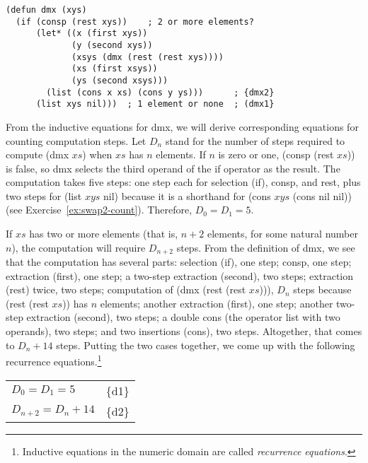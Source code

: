 \label{defun:dmx-copy}
\begin{Verbatim}
(defun dmx (xys)
  (if (consp (rest xys))    ; 2 or more elements?
      (let* ((x (first xys))
             (y (second xys))
             (xsys (dmx (rest (rest xys))))
             (xs (first xsys))
             (ys (second xsys)))
        (list (cons x xs) (cons y ys)))      ; {dmx2}
      (list xys nil)))  ; 1 element or none  ; (dmx1}
\end{Verbatim}

From the inductive equations for \textsf{dmx},
we will derive corresponding equations for counting computation steps.
Let $D_n$ stand for the number of steps required
to compute \textsf{(dmx $xs$)} when $xs$ has $n$ elements.
If $n$ is zero or one, \textsf{(consp (rest $xs$))} is false,
so \textsf{dmx} selects the third operand of the \textsf{if}
operator as the result.
The computation takes five steps: one step each for selection (\textsf{if}),
\textsf{consp}, and \textsf{rest},
plus two steps for \textsf{(list $xys$ nil)}
because it is a shorthand for \textsf{(cons $xys$ (cons nil nil))}
(see Exercise~\ref{ex:swap2-count}).
Therefore, $D_0 = D_1 = 5$.

If $xs$ has two or more elements (that is, $n+2$ elements,
for some natural number $n$),
the computation will require $D_{n+2}$ steps.
From the definition of \textsf{dmx}, we see that the computation
has several parts:
selection (\textsf{if}), one step;
\textsf{consp}, one step;
extraction (\textsf{first}), one step;
a two-step extraction (\textsf{second}), two steps;
extraction (\textsf{rest}) twice, two steps;
computation of \textsf{(dmx (rest (rest $xs$)))},
$D_n$ steps because \textsf{(rest (rest $xs$))} has $n$ elements;
another extraction (\textsf{first}), one step;
another two-step extraction (\textsf{second}), two steps;
a double \textsf{cons}
(the operator \textsf{list} with two operands), two steps;
and two insertions (\textsf{cons}), two steps.
Altogether, that comes to $D_n + 14$ steps.
Putting the two cases together,
we come up with the following recurrence equations.\footnote{Inductive
equations in the numeric domain are called
\label{def:recurrence-equations}\emph{recurrence equations}.}\\[-6mm]
\begin{center}
\begin{tabular}{ll}
  $D_0 = D_1 = 5$      & \{d1\} \\
  $D_{n+2} = D_n + 14$ & \{d2\} \\
\end{tabular}
\end{center}

